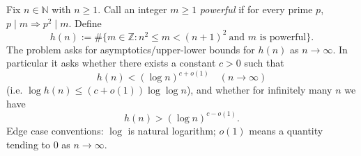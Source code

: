 Fix $n\in\mathbb{N}$ with $n\ge 1$. Call an integer $m\ge 1$ \emph{powerful} if for every prime $p$, $p\mid m\Rightarrow p^2\mid m$.
Define
\[
 h(n) := \#\{m\in\mathbb{Z}: n^2\le m < (n+1)^2 \ \text{and $m$ is powerful}\}.
\]
The problem asks for asymptotics/upper-lower bounds for $h(n)$ as $n\to\infty$.
In particular it asks whether there exists a constant $c>0$ such that
\[
 h(n) < (\log n)^{c+o(1)} \quad (n\to\infty)
\]
(i.e. $\log h(n) \le (c+o(1))\log\log n$), and whether for infinitely many $n$ we have
\[
 h(n) > (\log n)^{c-o(1)}.
\]
Edge case conventions: $\log$ is natural logarithm; $o(1)$ means a quantity tending to $0$ as $n\to\infty$.
